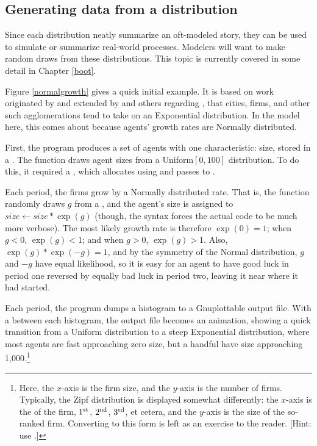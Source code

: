 \subsection{Generating data from a distribution}
Since each distribution neatly summarize an oft-modeled story, they can
be used to simulate or summarize real-world processes. Modelers will want
to make random draws from these distributions. This topic is currently
covered in some detail in Chapter \ref{boot}.


Figure \ref{normalgrowth} gives a quick initial example. It is based on
work originated by \citet{gibrat:growth} and extended by
\citet{axtell:firmwp} and
others regarding , that cities,
firms, and other such agglomerations tend to take on an Exponential
distribution. In the model here, this comes about because agents' growth
rates are Normally distributed.


First, the program produces a set of agents with one characteristic: size,
stored in a . The  function draws agent
sizes from a Uniform$[0,100]$ distribution.  To do this, it required a
, which  allocates using 
and passes to .

Each period, the firms grow by a Normally distributed rate. That is, the
 function randomly draws $g$ from a , and
the agent's size is assigned to $size \leftarrow size * \exp(g)$ (though, the
 syntax forces the actual code to be much more verbose).
The most likely growth rate is therefore $\exp(0) = 1$; 
when $g<0$, $\exp(g)<1$; and when $g>0$, $\exp(g)>1$. Also,
$\exp(g)*\exp(-g)=1$, and by the symmetry of the Normal distribution,
$g$ and $-g$ have equal likelihood, so it is easy for an agent to have
good luck in period one reversed by equally bad luck in period two,
leaving it near where it had started.

Each period, the program dumps a histogram to a Gnuplottable output
file. With a  between each histogram, the output file becomes
an animation, showing a quick transition from a Uniform distribution to
a steep Exponential distribution, where most agents are fast approaching
zero size, but a handful have size approaching 1,000.\footnote{Here,
the $x$-axis is the firm size, and the $y$-axis is the number of
firms. Typically, the Zipf distribution is displayed somewhat differently:
the $x$-axis is the  of the firm, $1^{\rm st}$,  $2^{\rm nd}$,
$3^{\rm rd}$, et cetera, and the $y$-axis is the size of the so-ranked
firm. Converting to this form is left as an exercise to the reader. [Hint:
use .]}




